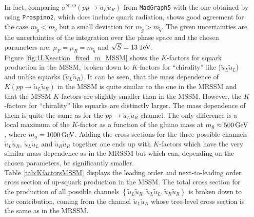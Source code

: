In fact, comparing $\sigma^{\mathrm{NLO}}(pp \to \tilde{u}_L\tilde{u}_R)$ from \texttt{MadGraph5} with the one obtained by using \texttt{Prospino2}, which does include quark radiation, shows good agreement for the case $m_{\tilde{g}} < m_{\tilde{q}}$ but a small deviation for $m_{\tilde{g}} > m_{\tilde{q}}$. The given uncertainties are the uncertainties of the integration over the phase space and the chosen parameters are: $\mu_F = \mu_R = m_{\tilde{q}}$ and $\sqrt{S} = \unit[13]{TeV}$.\\
Figure \ref{fig:1LXsection_fixed_m_MSSM} shows the $K$-factors for squark production in the MSSM, broken down to $K$-factors for ``chirality'' like ($\tilde{u}_L \tilde{u}_L$) and unlike squarks ($\tilde{u}_L \tilde{u}_R$). It can be seen, that the mass dependence of $K(pp \to \tilde{u}_L \tilde{u}_R)$ in the MSSM is quite similar to the one in the MRSSM and that the MSSM $K$-factors are slightly smaller than in the MSSM. However, the $K$-factors for ``chirality'' like squarks are distinctly larger. The mass dependence of them is quite the same as for the  $pp \to \tilde{u}_L \tilde{u}_R$ channel. The only difference is a local maximum of the $K$-factor as a function of the gluino mass at $m_{\tilde{g}} \approx \unit[500]{GeV}$, where $m_{\tilde{q}} = \unit[1000]{GeV}$. Adding the cross sections for the three possible channels $\tilde{u}_L \tilde{u}_R$, $\tilde{u}_L \tilde{u}_L$ and $\tilde{u}_R \tilde{u}_R$ together one ends up with $K$-factors which have the very similar mass dependence as in the MRSSM but which can, depending on the chosen parameters, be significantly smaller.\\
Table \ref{tab:KfactorsMSSM} displays the leading order and next-to-leading order cross section of up-squark production in the MSSM. The total cross section for the production of all possible channels $\left\{ \tilde{u}_L\tilde{u}_R, \tilde{u}_L\tilde{u}_L, \tilde{u}_R\tilde{u}_R \right\}$ is broken down to the contribution, coming from the channel $\tilde{u}_L\tilde{u}_R$ whose tree-level cross section is the same as in the MRSSM.

